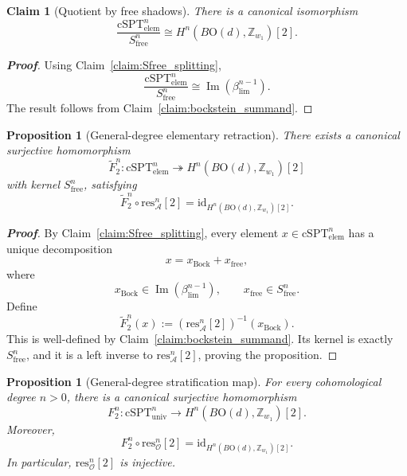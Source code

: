\documentclass[aps,prx,reprint,superscriptaddress,twocolumn,amsmath,amssymb,amsfonts, nofootinbib]{revtex4-2}
\newcommand{\res}{\text{res}}
\theoremstyle{apsstyle}
\newtheorem{proposition}[theorem]{Proposition}
\newtheorem{claim}{Claim}
\begin{document}
\begin{claim}[Quotient by free shadows] 
\label{cor:free_shadow_quotient} There is a canonical isomorphism 
\begin{equation} \frac{\mathrm{cSPT}_{\mathrm{elem}}^n} {S_{\mathrm{free}}^n} \cong H^n(B\mathrm{O}(d),\mathbb Z_{w_1})[2]. \end{equation} 
\end{claim} 
\begin{proof}[\textnormal{\textbf{Proof}}] 
Using Claim~\ref{claim:Sfree_splitting}, \[ \frac{\mathrm{cSPT}_{\mathrm{elem}}^n} {S_{\mathrm{free}}^n} \cong \operatorname{Im}(\beta_{\lim}^{n-1}). \] The result follows from Claim~\ref{claim:bockstein_summand}. 
\end{proof} 

\begin{proposition}[General-degree elementary retraction] 
\label{prop:general_degree_retraction} There exists a canonical surjective homomorphism \begin{equation} 
\widetilde F_2^n: \mathrm{cSPT}_{\mathrm{elem}}^n \twoheadrightarrow H^n(B\mathrm{O}(d),\mathbb Z_{w_1})[2] 
\end{equation} 
with kernel $S_{\mathrm{free}}^n$, satisfying 
\begin{equation} 
\widetilde F_2^n\circ\res_{\mathcal A}^{n}[2] = \mathrm{id}_{H^n(B\mathrm{O}(d),\mathbb Z_{w_1})[2]} . 
\end{equation} 
\end{proposition} 
\begin{proof}[\textnormal{\textbf{Proof}}] 
By Claim~\ref{claim:Sfree_splitting}, every element $x\in\mathrm{cSPT}_{\mathrm{elem}}^n$ has a unique decomposition 
\begin{equation} x=x_{\mathrm{Bock}}+x_{\mathrm{free}}, 
\end{equation} 
where \[ x_{\mathrm{Bock}}\in\operatorname{Im}(\beta_{\lim}^{n-1}), \qquad x_{\mathrm{free}}\in S_{\mathrm{free}}^n . \] Define 
\begin{equation} \widetilde F_2^n(x) := \left(\res_{\mathcal A}^{n}[2]\right)^{-1} (x_{\mathrm{Bock}}). 
\end{equation} 
This is well-defined by Claim~\ref{claim:bockstein_summand}. Its kernel is exactly $S_{\mathrm{free}}^n$, and it is a left inverse to $\res_{\mathcal A}^{n}[2]$, proving the proposition. 
\end{proof}

\bigskip 

\begin{proposition}[General-degree stratification map]
\label{prop:general_degree_stratification}
For every cohomological degree $n>0$, there is a canonical surjective homomorphism
\begin{equation}
F_2^n:
\mathrm{cSPT}_{\mathrm{univ}}^n
\longrightarrow
H^n(B\mathrm{O}(d),\mathbb Z_{w_1})[2].
\end{equation}
Moreover,
\begin{equation}
F_2^n\circ \res_{\mathcal O}^{n}[2]
=
\mathrm{id}_{H^n(B\mathrm{O}(d),\mathbb Z_{w_1})[2]}.
\end{equation}
In particular, $\res_{\mathcal O}^{n}[2]$ is injective.
\end{proposition}
\end{document}
